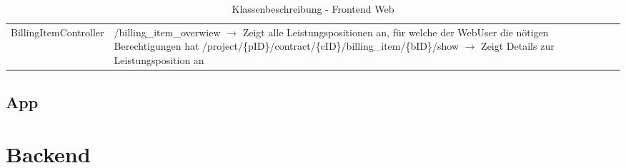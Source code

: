 \begin{table}[h]
\begin{tabularx}{\textwidth}{p{5.3cm} X}
		BillingItemController & /billing\_item\_overwiew $\rightarrow$ Zeigt alle Leistungspositionen an, für welche der WebUser die nötigen Berechtigungen hat \newline
		/project/\{pID\}/contract/\{cID\}/billing\_item/\{bID\}/show $\rightarrow$ Zeigt Details zur Leistungsposition an
	\end{tabularx}
	\caption{Klassenbeschreibung - Frontend Web}
	\label{table:klassenbeschreibung-web}
\end{table}

\clearpage

\subsection{App}

\section{Backend}
